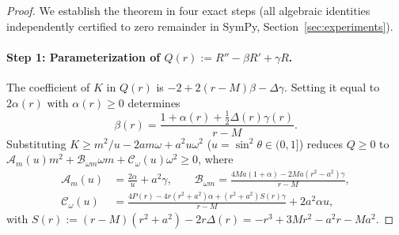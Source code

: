 \documentclass[11pt, a4paper]{article}
\theoremstyle{remark}
\begin{document}
\begin{proof}
We establish the theorem in four exact steps (all algebraic identities independently certified to zero remainder in SymPy, Section~\ref{sec:experiments}).

\paragraph{Step 1: Parameterization of $Q(r) := R'' - \beta R' + \gamma R$.}
The coefficient of $K$ in $Q(r)$ is $-2 + 2(r - M)\beta - \Delta\gamma$. Setting it equal to $2\alpha(r)$ with $\alpha(r) \ge 0$ determines
\begin{equation}
\label{eq:beta-rel}
\beta(r) = \frac{1 + \alpha(r) + \frac{1}{2}\Delta(r)\gamma(r)}{r - M}.
\end{equation}
Substituting $K \ge m^2/u - 2am\omega + a^2 u\omega^2$ ($u = \sin^2\theta \in (0, 1]$) reduces $Q \ge 0$ to $\mathcal{A}_m(u)m^2 + \mathcal{B}_{\omega m}\omega m + \mathcal{C}_\omega(u)\omega^2 \ge 0$, where
\begin{align}
\mathcal{A}_m(u) &= \frac{2\alpha}{u} + a^2\gamma, \qquad \mathcal{B}_{\omega m} = \frac{4Ma(1 + \alpha) - 2Ma(r^2 - a^2)\gamma}{r - M}, \\
\mathcal{C}_\omega(u) &= \frac{4P(r) - 4r(r^2 + a^2)\alpha + (r^2 + a^2)S(r)\gamma}{r - M} + 2a^2\alpha u,
\end{align}
with $S(r) := (r - M)(r^2 + a^2) - 2r\Delta(r) = -r^3 + 3Mr^2 - a^2 r - Ma^2$.


\end{proof}
\end{document}
